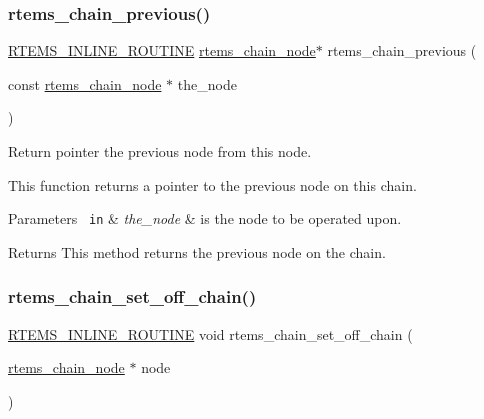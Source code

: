 \subsubsection{\texorpdfstring{rtems\_chain\_previous()}{rtems\_chain\_previous()}}
{\footnotesize\ttfamily \mbox{\hyperlink{group__RTEMSScoreBaseDefs_gac216239df231d5dbd15e3520b0b9313f}{R\+T\+E\+M\+S\+\_\+\+I\+N\+L\+I\+N\+E\+\_\+\+R\+O\+U\+T\+I\+NE}} \mbox{\hyperlink{structChain__Node__struct}{rtems\+\_\+chain\+\_\+node}}$\ast$ rtems\+\_\+chain\+\_\+previous (\begin{DoxyParamCaption}\item[{const \mbox{\hyperlink{structChain__Node__struct}{rtems\+\_\+chain\+\_\+node}} $\ast$}]{the\+\_\+node }\end{DoxyParamCaption})}



Return pointer the previous node from this node. 

This function returns a pointer to the previous node on this chain.


\begin{DoxyParams}[1]{Parameters}
\mbox{\texttt{ in}}  & {\em the\+\_\+node} & is the node to be operated upon.\\
\hline
\end{DoxyParams}
\begin{DoxyReturn}{Returns}
This method returns the previous node on the chain. 
\end{DoxyReturn}
\mbox{\label{group__ClassicChains_gac98e310c0368fcc3555d8df13b36e31d}} 
\subsubsection{\texorpdfstring{rtems\_chain\_set\_off\_chain()}{rtems\_chain\_set\_off\_chain()}}
{\footnotesize\ttfamily \mbox{\hyperlink{group__RTEMSScoreBaseDefs_gac216239df231d5dbd15e3520b0b9313f}{R\+T\+E\+M\+S\+\_\+\+I\+N\+L\+I\+N\+E\+\_\+\+R\+O\+U\+T\+I\+NE}} void rtems\+\_\+chain\+\_\+set\+\_\+off\+\_\+chain (\begin{DoxyParamCaption}\item[{\mbox{\hyperlink{structChain__Node__struct}{rtems\+\_\+chain\+\_\+node}} $\ast$}]{node }\end{DoxyParamCaption})}



